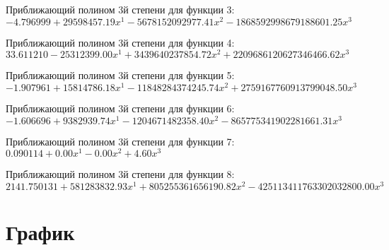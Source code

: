 \documentclass[a4paper,14pt]{extarticle}
\begin{document}
Приближающий полином 3й степени для функции 3: $-4.796999 + 29598457.19x^1 - 5678152092977.41x^2 - 1868592998679188601.25x^3$

Приближающий полином 3й степени для функции 4: $33.611210 - 25312399.00x^1 + 3439640237854.72x^2 + 2209686120627346466.62x^3$

Приближающий полином 3й степени для функции 5: $-1.907961 + 15814786.18x^1 - 11848284374245.74x^2 + 2759167760913799048.50x^3$

Приближающий полином 3й степени для функции 6: $-1.606696 + 9382939.74x^1 - 1204671482358.40x^2 - 865775341902281661.31x^3$

Приближающий полином 3й степени для функции 7: $0.090114 + 0.00x^1 - 0.00x^2 + 4.60x^3$

Приближающий полином 3й степени для функции 8: $2141.750131 + 581283832.93x^1 + 805255361656190.82x^2 - 425113411763302032800.00x^3$

\section{График}
\end{document}
